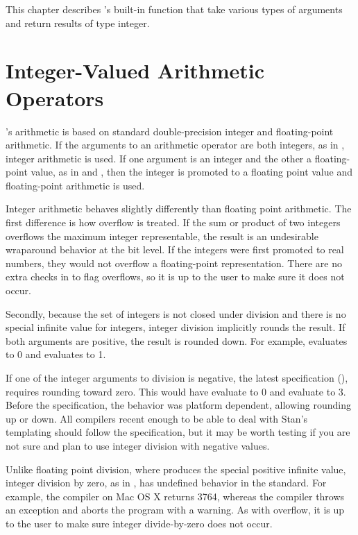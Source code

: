 \noindent
This chapter describes \Stan's built-in function that take various
types of arguments and return results of type integer.


\section{Integer-Valued Arithmetic Operators}\label{int-arithmetic.section}

\Stan's arithmetic is based on standard double-precision \Cpp integer and
floating-point arithmetic.  If the arguments to an arithmetic operator
are both integers, as in , integer arithmetic is used.  If
one argument is an integer and the other a floating-point value, as in
 and , then the integer is promoted to a floating
point value and floating-point arithmetic is used.

Integer arithmetic behaves slightly differently than floating point
arithmetic.  The first difference is how overflow is treated.  If the
sum or product of two integers overflows the maximum integer
representable, the result is an undesirable wraparound behavior at the
bit level.  If the integers were first promoted to real numbers, they
would not overflow a floating-point representation.  There are no
extra checks in \Stan to flag overflows, so it is up to the user to
make sure it does not occur.

Secondly, because the set of integers is not closed under division and
there is no special infinite value for integers, integer division
implicitly rounds the result.  If both arguments are positive, the
result is rounded down.  For example,  evaluates to 0 and
 evaluates to 1.  

If one of the integer arguments to division is negative, the latest
\Cpp specification (), requires rounding toward zero.  This
would have  evaluate to 0 and  evaluate to
3.  Before the  specification, the behavior was platform
dependent, allowing rounding up or down.  All compilers recent enough
to be able to deal with Stan's templating should follow the 
specification, but it may be worth testing if you are not sure and
plan to use integer division with negative values.

Unlike floating point division, where  produces the
special positive infinite value, integer division by zero, as in
, has undefined behavior in the \Cpp standard.  For
example, the \clang compiler on Mac OS X returns 3764, whereas the
\gpp compiler throws an exception and aborts the program with a
warning.  As with overflow, it is up to the user to make sure integer
divide-by-zero does not occur.

